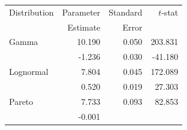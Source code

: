 \documentclass[]{book}
\begin{document}
\begin{longtable}[]{@{}lrrr@{}}
\toprule
Distribution & Parameter & Standard & \(t\)-stat\tabularnewline
\begin{minipage}[t]{0.24\columnwidth}\raggedright\strut
\strut
\end{minipage} & \begin{minipage}[t]{0.24\columnwidth}\raggedleft\strut
Estimate\strut
\end{minipage} & \begin{minipage}[t]{0.24\columnwidth}\raggedleft\strut
Error\strut
\end{minipage} & \begin{minipage}[t]{0.24\columnwidth}\raggedleft\strut
\strut
\end{minipage}\tabularnewline
Gamma & 10.190 & 0.050 & 203.831\tabularnewline
\begin{minipage}[t]{0.24\columnwidth}\raggedright\strut
\strut
\end{minipage} & \begin{minipage}[t]{0.24\columnwidth}\raggedleft\strut
-1.236\strut
\end{minipage} & \begin{minipage}[t]{0.24\columnwidth}\raggedleft\strut
0.030\strut
\end{minipage} & \begin{minipage}[t]{0.24\columnwidth}\raggedleft\strut
-41.180\strut
\end{minipage}\tabularnewline
Lognormal & 7.804 & 0.045 & 172.089\tabularnewline
\begin{minipage}[t]{0.24\columnwidth}\raggedright\strut
\strut
\end{minipage} & \begin{minipage}[t]{0.24\columnwidth}\raggedleft\strut
0.520\strut
\end{minipage} & \begin{minipage}[t]{0.24\columnwidth}\raggedleft\strut
0.019\strut
\end{minipage} & \begin{minipage}[t]{0.24\columnwidth}\raggedleft\strut
27.303\strut
\end{minipage}\tabularnewline
Pareto & 7.733 & 0.093 & 82.853\tabularnewline
\begin{minipage}[t]{0.24\columnwidth}\raggedright\strut
\strut
\end{minipage} & \begin{minipage}[t]{0.24\columnwidth}\raggedleft\strut
-0.001\strut
\end{minipage} & \begin{minipage}[t]{0.24\columnwidth}\raggedleft\strut

\end{minipage}
\end{longtable}
\end{document}
